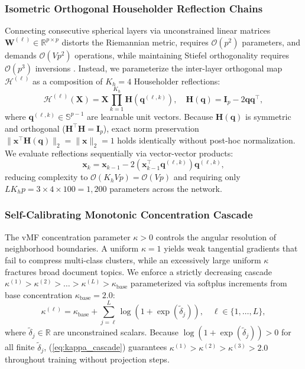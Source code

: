 \documentclass[journal]{IEEEtran}
\begin{document}
\subsubsection{Isometric Orthogonal Householder Reflection Chains}
Connecting consecutive spherical layers via unconstrained linear matrices $\mathbf{W}^{(\ell)} \in \mathbb{R}^{p \times p}$ distorts the Riemannian metric, requires $\mathcal{O}(p^2)$ parameters, and demands $\mathcal{O}(Vp^2)$ operations, while maintaining Stiefel orthogonality requires $\mathcal{O}(p^3)$ inversions \cite{mhammedi2017efficient}. Instead, we parameterize the inter-layer orthogonal map $\mathcal{H}^{(\ell)}$ as a composition of $K_h = 4$ Householder reflections:
\begin{equation}
\mathcal{H}^{(\ell)}(\mathbf{X}) = \mathbf{X} \prod_{k=1}^{K_h} \mathbf{H}\!\left(\mathbf{q}^{(\ell,k)}\right), \quad \mathbf{H}(\mathbf{q}) = \mathbf{I}_p - 2\mathbf{q}\mathbf{q}^\top,
\label{eq:householder}
\end{equation}
where $\mathbf{q}^{(\ell,k)} \in \mathbb{S}^{p-1}$ are learnable unit vectors. Because $\mathbf{H}(\mathbf{q})$ is symmetric and orthogonal ($\mathbf{H}^\top \mathbf{H} = \mathbf{I}_p$), exact norm preservation $\|\mathbf{x}^\top \mathbf{H}(\mathbf{q})\|_2 = \|\mathbf{x}\|_2 = 1$ holds identically without post-hoc normalization. We evaluate reflections sequentially via vector-vector products:
\begin{equation}
\mathbf{x}_{k} = \mathbf{x}_{k-1} - 2\left(\mathbf{x}_{k-1}^\top \mathbf{q}^{(\ell,k)}\right)\mathbf{q}^{(\ell,k)},
\label{eq:householder_fast}
\end{equation}
reducing complexity to $\mathcal{O}(K_h V p) = \mathcal{O}(Vp)$ and requiring only $L K_h p = 3 \times 4 \times 100 = 1,200$ parameters across the network.

\subsubsection{Self-Calibrating Monotonic Concentration Cascade}
The vMF concentration parameter $\kappa > 0$ controls the angular resolution of neighborhood boundaries. A uniform $\kappa = 1$ yields weak tangential gradients that fail to compress multi-class clusters, while an excessively large uniform $\kappa$ fractures broad document topics. We enforce a strictly decreasing cascade $\kappa^{(1)} > \kappa^{(2)} > \dots > \kappa^{(L)} > \kappa_{\text{base}}$ parameterized via softplus increments from base concentration $\kappa_{\text{base}} = 2.0$:
\begin{equation}
\kappa^{(\ell)} = \kappa_{\text{base}} + \sum_{j=\ell}^{L} \log\!\left(1 + \exp(\tilde{\delta}_j)\right), \quad \ell \in \{1, \dots, L\},
\label{eq:kappa_cascade}
\end{equation}
where $\tilde{\delta}_j \in \mathbb{R}$ are unconstrained scalars. Because $\log(1 + \exp(\tilde{\delta}_j)) > 0$ for all finite $\tilde{\delta}_j$, (\ref{eq:kappa_cascade}) guarantees $\kappa^{(1)} > \kappa^{(2)} > \kappa^{(3)} > 2.0$ throughout training without projection steps.
\end{document}
